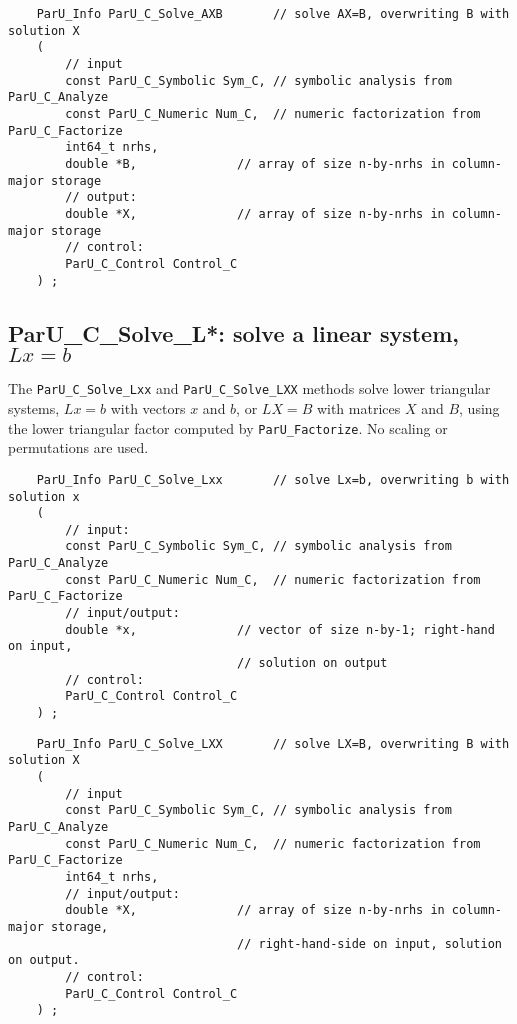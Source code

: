 \documentclass[12pt]{article}
\begin{document}
    {\footnotesize
    \begin{verbatim}
    ParU_Info ParU_C_Solve_AXB       // solve AX=B, overwriting B with solution X
    (
        // input
        const ParU_C_Symbolic Sym_C, // symbolic analysis from ParU_C_Analyze
        const ParU_C_Numeric Num_C,  // numeric factorization from ParU_C_Factorize
        int64_t nrhs,
        double *B,              // array of size n-by-nrhs in column-major storage
        // output:
        double *X,              // array of size n-by-nrhs in column-major storage
        // control:
        ParU_C_Control Control_C
    ) ; \end{verbatim} }

\subsection{{\sf ParU\_C\_Solve\_L*}: solve a linear system, $Lx=b$}

    The \verb'ParU_C_Solve_Lxx' and \verb'ParU_C_Solve_LXX' methods solve lower
    triangular systems, $Lx=b$ with vectors $x$ and $b$, or $LX=B$ with
    matrices $X$ and $B$, using the lower triangular factor computed by
    \verb'ParU_Factorize'.  No scaling or permutations are used.

    {\footnotesize
    \begin{verbatim}
    ParU_Info ParU_C_Solve_Lxx       // solve Lx=b, overwriting b with solution x
    (
        // input:
        const ParU_C_Symbolic Sym_C, // symbolic analysis from ParU_C_Analyze
        const ParU_C_Numeric Num_C,  // numeric factorization from ParU_C_Factorize
        // input/output:
        double *x,              // vector of size n-by-1; right-hand on input,
                                // solution on output
        // control:
        ParU_C_Control Control_C
    ) ; \end{verbatim} }

    {\footnotesize
    \begin{verbatim}
    ParU_Info ParU_C_Solve_LXX       // solve LX=B, overwriting B with solution X
    (
        // input
        const ParU_C_Symbolic Sym_C, // symbolic analysis from ParU_C_Analyze
        const ParU_C_Numeric Num_C,  // numeric factorization from ParU_C_Factorize
        int64_t nrhs,
        // input/output:
        double *X,              // array of size n-by-nrhs in column-major storage,
                                // right-hand-side on input, solution on output.
        // control:
        ParU_C_Control Control_C
    ) ; \end{verbatim} }
\end{document}

